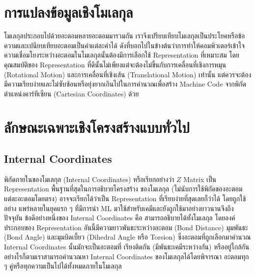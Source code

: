 \section{การแปลงข้อมูลเชิงโมเลกุล}
\label{sec:mol_transform}

โมเลกุลประกอบไปด้วยอะตอมหลายอะตอมมารวมกัน เราจึงเปรียบเทียบโมเลกุลเป็นประโยคหรือข้อความและเปนียบเทียบอะตอมเป็นคำแต่ละคำได้
ดังที่บอกไปในข้างต้นว่าการทำให้คอมพิวเตอร์เข้าใจความเชื่อมโยงระหว่างอะตอมในโมเลกุลนั้นต้องมีการเลือกใช้ Representation ที่เหมาะสม
โดยคุณสมบัติของ Representation ที่ดีนั้นไม่เพียงแต่จะต้องไม่ขึ้นกับการเคลื่อนที่เชิงการหมุน (Rotational Motion) และการเคลื่อนที่เชิงเส้น 
(Translational Motion) เท่านั้น แต่ควรจะต้องมีความเรียบง่ายและไม่ซับซ้อนหรือยุ่งยากเกินไปในการคำนวณเพื่อสร้าง Machine Code 
จากพิกัดตำแหน่งคาร์ทีเซียน (Cartesian Coordinates) ด้วย

\section{ลักษณะเฉพาะเชิงโครงสร้างแบบทั่วไป}
\label{sec:struc_feat}

\subsection{Internal Coordinates}
\label{ssec:internal_coord}

พิกัดภายในของโมเลกุล (Internal Coordinates) หรือเรียกอย่างว่า $Z$ Matrix เป็น Representation พื้นฐานที่สุดในการอธิบายโครงสร้าง%
ของโมเลกุล (ไม่นับการใช้พิกัดของอะตอมแต่ละอะตอมโดยตรง) อาจจะเรียกได้ว่าเป็น Representation ที่เรียบง่ายที่สุดเลยก็ว่าได้ โดยถูกใช้อย่าง%
แพร่หลายในยุคแรก ๆ ที่มีการนำ ML มาใช้สำหรับเคมีและยังถูกใช้มาอย่างยาวนานจึงถึงปัจจุบัน ข้อดีอย่างหนึ่งของ Internal Coordinates คือ%
สามารถอธิบายได้ทั้งโมเลกุล โดยองค์ประกอบของ Representation อันนี้มีความยาวพันธะระหว่างอะตอม (Bond Distance) มุมพันธะ (Bond 
Angle) และมุมบิดเบี้ยว (Dihedral Angle หรือ Torsion) ซึ่งอะตอมที่ถูกเลือกมาคำนวณ Internal Coordinates นั้นมักจะเป็นอะตอมที่%
เรียงติดกัน (มีพันธะเคมีระหว่างกัน) หรืออยู่ใกล้กัน อย่างไรก็ตามเราสามารถคำนวณหา Internal Coordinates ของโมเลกุลได้โดยพิจารณา%
อะตอมทุก ๆ คู่หรือทุกความเป็นไปได้ทั้งหมดภายในโมเลกุล

